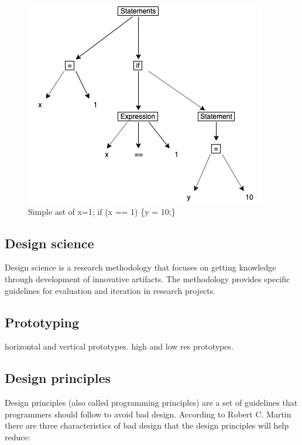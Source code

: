 \documentclass{article}
\begin{document}
\begin{figure}[h!]
	\centering
	\includegraphics[width=\linewidth/2]{report/ast.png}
	\caption{Simple \gls{ast} of x=1; if (x == 1) \{y = 10;\}}
	\label{fig:ast}
\end{figure}


\subsection{Design science}
Design science is a research methodology that focuses on getting knowledge through development of innovative artifacts. The methodology provides specific guidelines for evaluation and iteration in research projects.

\subsection{Prototyping}

horizontal and vertical prototypes. high and low res prototypes.

\subsection{Design principles}
Design principles (also called programming principles) are a set of guidelines that programmers should follow to avoid bad design. According to Robert C. Martin \cite{robertcmartinprinciples} there are three characteristics of bad design that the design principles will help reduce:
\end{document}
